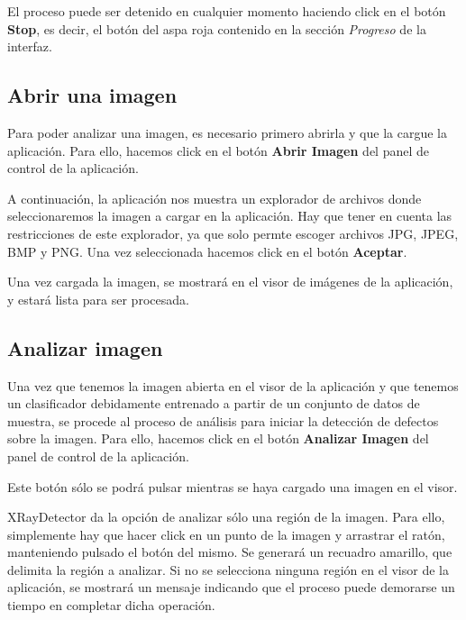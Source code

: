 El proceso puede ser detenido en cualquier momento haciendo click en el botón \textbf{Stop}, es decir, el botón del aspa roja contenido en la sección \textit{Progreso} de la interfaz.

\subsection{Abrir una imagen}
Para poder analizar una imagen, es necesario primero abrirla y que la cargue la aplicación. Para ello, hacemos click en el botón \textbf{Abrir Imagen} del panel de control de la aplicación.


A continuación, la aplicación nos muestra un explorador de archivos donde seleccionaremos la imagen a cargar en la aplicación. Hay que tener en cuenta las restricciones de este explorador, ya que solo permte escoger archivos JPG, JPEG, BMP y PNG. Una vez seleccionada hacemos click en el botón \textbf{Aceptar}.


Una vez cargada la imagen, se mostrará en el visor de imágenes de la aplicación, y estará lista para ser procesada.

\subsection{Analizar imagen}
Una vez que tenemos la imagen abierta en el visor de la aplicación y que tenemos un clasificador debidamente entrenado a partir de un conjunto de datos de muestra, se procede al proceso de análisis para iniciar la detección de defectos sobre la imagen. Para ello, hacemos click en el botón \textbf{Analizar Imagen} del panel de control de la aplicación.


Este botón sólo se podrá pulsar mientras se haya cargado una imagen en el visor.

XRayDetector da la opción de analizar sólo una región de la imagen. Para ello, simplemente hay que hacer click en un punto de la imagen y arrastrar el ratón, manteniendo pulsado el botón del mismo. Se generará un recuadro amarillo, que delimita la región a analizar. Si no se selecciona ninguna región en el visor de la aplicación, se mostrará un mensaje indicando que el proceso puede demorarse un tiempo en completar dicha operación.

